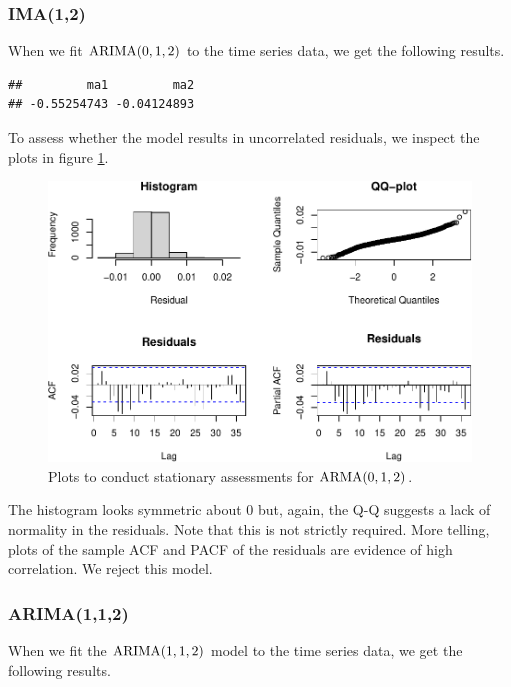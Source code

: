 \documentclass[final,
  11pt,
]{article}
\begin{document}
\hypertarget{ima12}{%
\subsubsection{IMA(1,2)}\label{ima12}}

When we fit \(\operatorname{ARIMA}(0,1,2)\) to the time series data, we get the
following results.

\begin{verbatim}
##         ma1         ma2 
## -0.55254743 -0.04124893
\end{verbatim}

To assess whether the model results in uncorrelated residuals, we
inspect the plots in figure \ref{fig:res3}.

\begin{figure}
\includegraphics{paper_files/figure-latex/unnamed-chunk-11-1.pdf}
    \caption{Plots to conduct stationary assessments for $\operatorname{ARMA}(0,1,2)$.}
    \label{fig:res3}
\end{figure}

The histogram looks symmetric about \(0\) but, again, the Q-Q suggests a
lack of normality in the residuals. Note that this is not strictly
required. More telling, plots of the sample ACF and PACF of the
residuals are evidence of high correlation. We reject this model.

\hypertarget{arima112}{%
\subsubsection{ARIMA(1,1,2)}\label{arima112}}

When we fit the \(\operatorname{ARIMA}(1,1,2)\) model to the time series data, we get
the following results.
\end{document}
